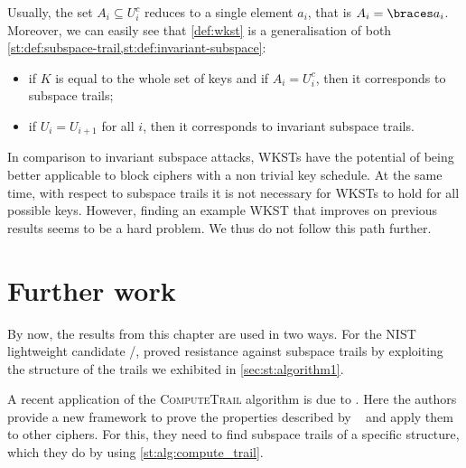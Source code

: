 Usually, the set $A_i \subseteq U_i^c$ reduces to a single element $a_i$, that is $A_i = \set{a_i}$.
Moreover, we can easily see that \cref{def:wkst} is a generalisation of both \cref{st:def:subspace-trail,st:def:invariant-subspace}:
\begin{itemize}
\item if $K$ is equal to the whole set of keys and if $A_i = U_i^c$, then it corresponds to subspace trails;
\item if $U_i = U_{i+1}$ for all $i$, then it corresponds to invariant subspace trails.
\end{itemize}

In comparison to invariant subspace attacks, WKSTs have the potential of being better applicable to block ciphers with a non trivial key schedule.
At the same time, with respect to subspace trails it is not necessary for WKSTs to hold for all possible keys.
However, finding an example WKST that improves on previous results seems to be a hard problem.
We thus do not follow this path further.

\section{Further work}
By now, the results from this chapter are used in two ways.
For the NIST lightweight candidate \saturnin/, \textcite{LWC:Saturnin} proved resistance against subspace trails by exploiting the structure of the trails we exhibited in \cref{sec:st:algorithm1}.

A recent application of the \textsc{ComputeTrail} algorithm is due to \textcite{ToSC:BouCanCog19}.
Here the authors provide a new framework to prove the properties described by \citeauthor{ToSC:GraRecRon16}~ and apply them to other ciphers.
For this, they need to find subspace trails of a specific structure, which they do by using \cref{st:alg:compute_trail}.
